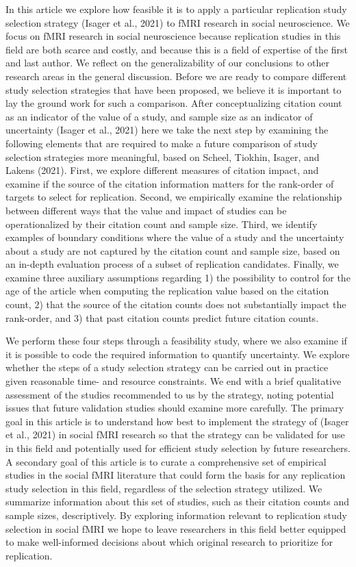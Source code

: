 \documentclass[
  man,floatsintext]{apa6}
\begin{document}
In this article we explore how feasible it is to apply a particular replication study selection strategy (Isager et al., 2021) to fMRI research in social neuroscience. We focus on fMRI research in social neuroscience because replication studies in this field are both scarce and costly, and because this is a field of expertise of the first and last author. We reflect on the generalizability of our conclusions to other research areas in the general discussion. Before we are ready to compare different study selection strategies that have been proposed, we believe it is important to lay the ground work for such a comparison. After conceptualizing citation count as an indicator of the value of a study, and sample size as an indicator of uncertainty (Isager et al., 2021) here we take the next step by examining the following elements that are required to make a future comparison of study selection strategies more meaningful, based on Scheel, Tiokhin, Isager, and Lakens (2021). First, we explore different measures of citation impact, and examine if the source of the citation information matters for the rank-order of targets to select for replication. Second, we empirically examine the relationship between different ways that the value and impact of studies can be operationalized by their citation count and sample size. Third, we identify examples of boundary conditions where the value of a study and the uncertainty about a study are not captured by the citation count and sample size, based on an in-depth evaluation process of a subset of replication candidates. Finally, we examine three auxiliary assumptions regarding 1) the possibility to control for the age of the article when computing the replication value based on the citation count, 2) that the source of the citation counts does not substantially impact the rank-order, and 3) that past citation counts predict future citation counts.

We perform these four steps through a feasibility study, where we also examine if it is possible to code the required information to quantify uncertainty. We explore whether the steps of a study selection strategy can be carried out in practice given reasonable time- and resource constraints. We end with a brief qualitative assessment of the studies recommended to us by the strategy, noting potential issues that future validation studies should examine more carefully. The primary goal in this article is to understand how best to implement the strategy of (Isager et al., 2021) in social fMRI research so that the strategy can be validated for use in this field and potentially used for efficient study selection by future researchers. A secondary goal of this article is to curate a comprehensive set of empirical studies in the social fMRI literature that could form the basis for any replication study selection in this field, regardless of the selection strategy utilized. We summarize information about this set of studies, such as their citation counts and sample sizes, descriptively. By exploring information relevant to replication study selection in social fMRI we hope to leave researchers in this field better equipped to make well-informed decisions about which original research to prioritize for replication.
\end{document}

